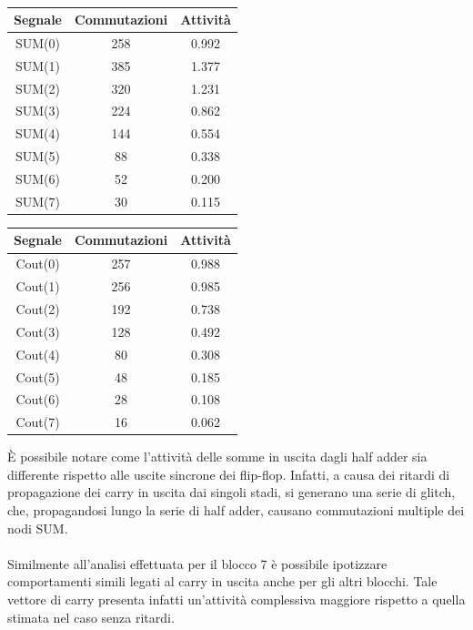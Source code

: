 \documentclass[11pt,  english, makeidx, a4paper, titlepage, oneside]{book}
\begin{document}
\\
\begin{center}
	\begin{tabular}{|c|c|c|}
	\hline
	Segnale & Commutazioni & Attività \\ 
	\hline
	SUM(0) & 258  & 0.992  \\
	\hline
	SUM(1) & 385  & 1.377  \\
	\hline
	SUM(2) & 320  &  1.231  \\
	\hline
	SUM(3) & 224  & 0.862  \\
	\hline
	SUM(4) & 144  & 0.554  \\
	\hline
	SUM(5) & 88  & 0.338  \\
	\hline
	SUM(6) & 52  & 0.200  \\
	\hline
	SUM(7) & 30  & 0.115  \\
	\hline
	\end{tabular}	
	\begin{tabular}{|c|c|c|}
	\hline
	Segnale & Commutazioni & Attività \\ 
	\hline
	Cout(0) & 257  & 0.988  \\
	\hline
	Cout(1) & 256  & 0.985  \\
	\hline
	Cout(2) & 192  & 0.738  \\
	\hline
	Cout(3) & 128  & 0.492  \\
	\hline
	Cout(4) & 80  & 0.308  \\
	\hline
	Cout(5) & 48  & 0.185  \\
	\hline
	Cout(6) & 28  & 0.108  \\
	\hline
	Cout(7) & 16  & 0.062  \\
	\hline
	\end{tabular}
\end{center}
\vspace{0.3cm}
È possibile notare come l'attività delle somme in uscita dagli
half adder sia differente rispetto alle uscite sincrone dei flip-flop.
Infatti, a causa dei ritardi di propagazione dei carry in uscita dai 
singoli stadi, si generano una serie di glitch, che, propagandosi lungo
la serie di half adder, causano commutazioni multiple dei nodi SUM.
\\\\
Similmente all'analisi effettuata per il blocco 7 è possibile ipotizzare
comportamenti simili legati al carry in uscita anche per gli altri blocchi.
Tale vettore di carry presenta infatti un'attività complessiva maggiore 
rispetto a quella stimata nel caso senza ritardi.
\\\\
\end{document}
